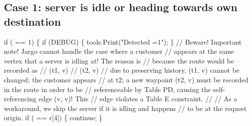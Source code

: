 \nwendcode{}\nwdocspar
\subsection{Case 1: server is idle or heading towards own destination}
\nwenddocs{}\endmoddef\nwstartdeflinemarkup{}\nwenddeflinemarkup
if ( == 1) \{
  if (DEBUG) \{
    tools.Print("Detected =1");
  \}
  // Beware! Important note! Jargo cannot handle the case where a customer
  // appears at the same vertex that a server is idling at! The reason is
  // because the route would be recorded as
  //   (t1, v)
  //   (t2, v)
  // due to preserving history, (t1, v) cannot be changed; the customer appears
  // at t2; a new waypoint (t2, v) must be recorded in the route in order to be
  // referenceable by Table PD, causing the self-referencing edge (v, v)! This
  // edge violates a Table E constraint.
  //
  // As a workaround, we skip the server if it is idling and happens
  // to be at the request origin.
  if ( == r[4]) \{
    continue;
  \}

